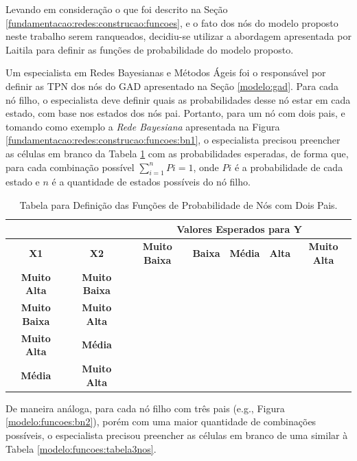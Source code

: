 Levando em consideração o que foi descrito na Seção \ref{fundamentacao:redes:construcao:funcoes}, e o fato dos nós do modelo proposto neste trabalho serem ranqueados, decidiu-se utilizar a abordagem apresentada por Laitila \cite{laitila} para definir as funções de probabilidade do modelo proposto.

Um especialista em Redes Bayesianas e Métodos Ágeis foi o responsável por definir as TPN dos nós do GAD apresentado na Seção \ref{modelo:gad}. Para cada nó filho, o especialista deve definir quais as probabilidades desse nó estar em cada estado, com base nos estados dos nós pai. Portanto, para um nó com dois pais, e tomando como exemplo a \textit{Rede Bayesiana} apresentada na Figura \ref{fundamentacao:redes:construcao:funcoes:bn1}, o especialista precisou preencher as células em branco da Tabela \ref{modelo:funcoes:tabela2nos} com as probabilidades esperadas, de forma que, para cada combinação possível $\sum_{i=1}^{n}Pi = 1$, onde $Pi$ é a probabilidade de cada estado e $n$ é a quantidade de estados possíveis do nó filho.

\begin{table}[ht!]
\centering
\caption{Tabela para Definição das Funções de Probabilidade de Nós com Dois Pais.}
\label{modelo:funcoes:tabela2nos}
\begin{tabular}{|c|c|c|c|c|c|c|}
\hline
\multicolumn{2}{|l|}{}                      & \multicolumn{5}{c|}{\textbf{Valores Esperados para Y}}                                       \\ \hline
\textbf{X1}          & \textbf{X2}          & \textbf{Muito Baixa} & \textbf{Baixa} & \textbf{Média} & \textbf{Alta} & \textbf{Muito Alta} \\ \hline
\textbf{Muito Alta}  & \textbf{Muito Baixa} &               &         &         &        &               \\ \hline
\textbf{Muito Baixa} & \textbf{Muito Alta}  &               &         &         &        &              \\ \hline
\textbf{Muito Alta}  & \textbf{Média}       &               &         &         &        &              \\ \hline
\textbf{Média}       & \textbf{Muito Alta}  &               &         &         &        &              \\ \hline
\end{tabular}
\end{table}

De maneira análoga, para cada nó filho com três pais (e.g., Figura \ref{modelo:funcoes:bn2}), porém com uma maior quantidade de combinações possíveis, o especialista precisou preencher as células em branco de uma similar à Tabela \ref{modelo:funcoes:tabela3nos}.

